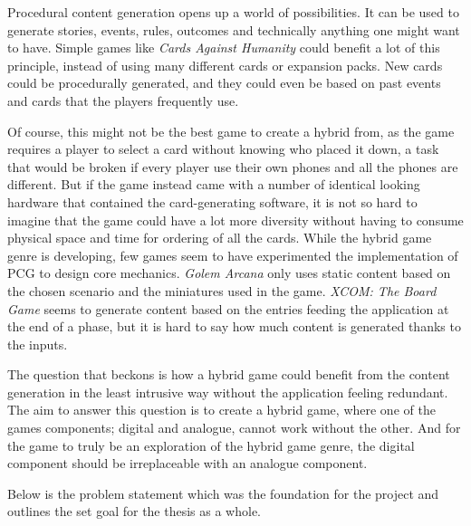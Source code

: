 Procedural content generation opens up a world of possibilities. It can be used to generate stories, events, rules, outcomes and technically anything one might want to have. Simple games like \textit{Cards Against Humanity} could benefit a lot of this principle, instead of using many different cards or expansion packs. New cards could be procedurally generated, and they could even be based on past events and cards that the players frequently use. 

Of course, this might not be the best game to create a hybrid from, as the game requires a player to select a card without knowing who placed it down, a task that would be broken if every player use their own phones and all the phones are different. But if the game instead came with a number of identical looking hardware that contained the card-generating software, it is not so hard to imagine that the game could have a lot more diversity without having to consume physical space and time for ordering of all the cards.
While the hybrid game genre is developing, few games seem to have experimented the implementation of PCG to design core mechanics. 
\textit{Golem Arcana} only uses static content based on the chosen scenario and the miniatures used in the game.
\textit{XCOM: The Board Game} seems to generate content based on the entries feeding the application at the end of a phase, but it is hard to say how much content is generated thanks to the inputs. 

The question that beckons is how a hybrid game could benefit from the content generation in the least intrusive way without the application feeling redundant. The aim to answer this question is to create a hybrid game, where one of the games components; digital and analogue, cannot work without the other. And for the game to truly be an exploration of the hybrid game genre, the digital component should be irreplaceable with an analogue component. 

Below is the problem statement which was the foundation for the project and outlines the set goal for the thesis as a whole.

